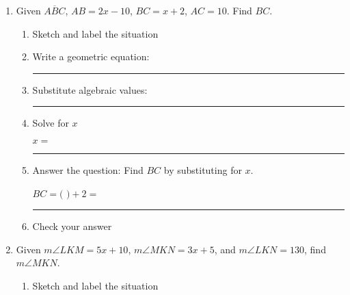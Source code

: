 \documentclass[12pt, oneside]{article}
\begin{document}
\begin{enumerate}
      \item Given $\overline{ABC}$, $AB=2x-10$, $BC=x+2$, $AC=10$. Find ${BC}$.
      \begin{enumerate}
        \item Sketch and label the situation
        \begin{flushright}
        \end{flushright} \vspace{2cm}
        \item Write a geometric equation: \rule{5cm}{0.15mm} \vspace{1cm}
        \item Substitute algebraic values: \rule{5cm}{0.15mm}
        \item Solve for $x$
        \vspace{4cm}
        \begin{center} $x=$ \rule{1cm}{0.15mm} \end{center}
        \item Answer the question: Find $BC$ by substituting for $x$.\\
        \begin{center} $BC=($ \hspace{1cm} $)+2=$ \rule{1cm}{0.15mm} \end{center} \bigskip
        \item Check your answer
      \end{enumerate}
      \vspace{2cm}

\newpage
      \item Given $m\angle LKM = 5x+10$, $m\angle MKN = 3x+5$, and $m\angle LKN = 130$, find $m\angle MKN$.  \vspace{.2cm}
      \begin{enumerate}
        \item Sketch and label the situation
        \begin{flushright}
        \end{flushright}
        \vspace{1cm}


\end{enumerate}
\end{enumerate}
\end{document}
